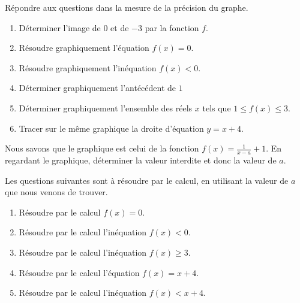 
\begin{exercice}\label{exosmath-0316}

Répondre aux questions dans la mesure de la précision du graphe.

\begin{center}
   
\end{center}
\begin{enumerate}
    \item
        Déterminer l'image de \( 0\) et de \( -3\) par la fonction \( f\).
    \item
        Résoudre graphiquement l'équation \( f(x)=0\).
    \item
        Résoudre graphiquement l'inéquation \( f(x)<0\).
    \item
        Déterminer graphiquement l'antécédent de \( 1\)
    \item
        Déterminer graphiquement l'ensemble des réels \( x\) tels que \( 1\leq f(x)\leq 3\).
    \item
        Tracer sur le même graphique la droite d'équation \( y=x+4\).
\end{enumerate}

Nous savons que le graphique est celui de la fonction \( f(x)=\frac{1}{ x-a }+1\). En regardant le graphique, déterminer la valeur interdite et donc la valeur de \( a\).

Les questions suivantes sont à résoudre par le calcul, en utilisant la valeur de \( a\) que nous venons de trouver.
\begin{enumerate}
    \item
        Résoudre par le calcul \( f(x)=0\).
    \item
        Résoudre par le calcul l'inéquation \( f(x)<0\).
    \item
        Résoudre par le calcul l'inéquation \( f(x)\geq 3\).
    \item
        Résoudre par le calcul l'équation \( f(x)=x+4\).
    \item
        Résoudre par le calcul l'inéquation \( f(x)<x+4\).
\end{enumerate}

\end{exercice}
